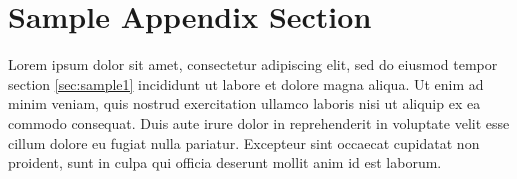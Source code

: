 \documentclass[preprint,12pt]{elsarticle}
\begin{document}
\appendix

\section{Sample Appendix Section}
\label{sec:sample:appendix}
Lorem ipsum dolor sit amet, consectetur adipiscing elit, sed do eiusmod tempor section \ref{sec:sample1} incididunt ut labore et dolore magna aliqua. Ut enim ad minim veniam, quis nostrud exercitation ullamco laboris nisi ut aliquip ex ea commodo consequat. Duis aute irure dolor in reprehenderit in voluptate velit esse cillum dolore eu fugiat nulla pariatur. Excepteur sint occaecat cupidatat non proident, sunt in culpa qui officia deserunt mollit anim id est laborum.

 






\end{document}
